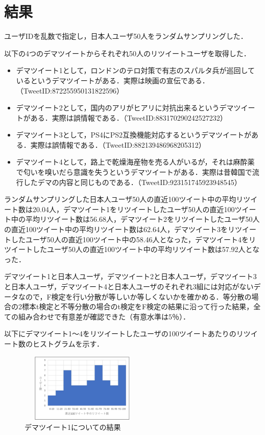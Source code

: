 \documentclass[uplatex,twocolumn]{jsarticle}
\begin{document}
\section{結果}
ユーザIDを乱数で指定し，日本人ユーザ50人をランダムサンプリングした．

以下の4つのデマツイートからそれぞれ50人のリツイートユーザを取得した．
\begin{itemize}
 \item デマツイート1として，ロンドンのテロ対策で有志のスパルタ兵が巡回しているというデマツイートがある．実際は映画の宣伝である．（TweetID:872255950131822596）
 \item デマツイート2として，国内のアリがヒアリに対抗出来るというデマツイートがある．実際は誤情報である．（TweetID:883170290242527232）
 \item デマツイート3として，PS4にPS2互換機能対応するというデマツイートがある．実際は誤情報である．（TweetID:882139486968205312）
 \item デマツイート4として，路上で乾燥海産物を売る人がいるが，それは麻酔薬で匂いを嗅いだら意識を失うというデマツイートがある．実際は昔韓国で流行したデマの内容と同じものである．（TweetID:923151745923948545）
\end{itemize}

ランダムサンプリングした日本人ユーザ50人の直近100ツイート中の平均リツイート数は20.04人，デマツイート1をリツイートしたユーザ50人の直近100ツイート中の平均リツイート数は56.68人，デマツイート2をリツイートしたユーザ50人の直近100ツイート中の平均リツイート数は62.64人，デマツイート3をリツイートしたユーザ50人の直近100ツイート中の58.46人となった，デマツイート4をリツイートしたユーザ50人の直近100ツイート中の平均リツイート数は57.92人となった．

デマツイート1と日本人ユーザ，デマツイート2と日本人ユーザ，デマツイート3と日本人ユーザ，デマツイート4と日本人ユーザのそれぞれ3組には対応がないデータなので，F検定を行い分散が等しいか等しくないかを確かめる．等分散の場合の2標本t検定と不等分散の場合のt検定をF検定の結果に沿って行った結果，全ての組み合わせで有意差が確認できた（有意水準は5％）．

以下にデマツイート1～4をリツイートしたユーザの100ツイートあたりのリツイート数のヒストグラムを示す．

\begin{figure}[htbp]
\centering
\includegraphics[clip,width=6.0cm,height=3.3cm]{d1.pdf}
\caption{デマツイート1についての結果}
\label{ヒストグラム1}
\end{figure}
\end{document}
